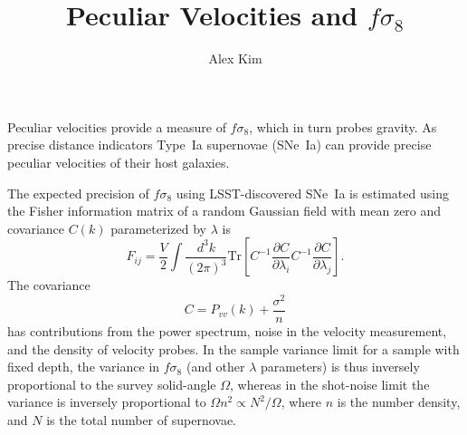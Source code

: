 \documentclass[a4paper,10pt]{article}
\title{Peculiar Velocities and $f\sigma_8$}
\author{Alex Kim}
\date{}
\begin{document}
\maketitle
Peculiar velocities provide a measure of $f\sigma_8$, which in turn probes gravity.  As precise distance indicators Type~Ia supernovae (SNe~Ia)
can provide precise peculiar velocities of their host galaxies.

The  expected precision of $f\sigma_8$ using LSST-discovered SNe~Ia is estimated using
the Fisher information matrix of a random Gaussian field with mean zero and covariance $C(k)$ parameterized by $\lambda$ is
\begin{equation}
F_{ij} = \frac{V}{2}\int \frac{d^3k}{(2\pi)^3} \text{Tr}\left[ C^{-1} \frac{\partial C}{\partial \lambda_i} C^{-1}
\frac{\partial C}{\partial \lambda_j} \right].
\end{equation}
The covariance
\begin{equation}
C = P_{vv}(k) + \frac{\sigma^2}{n}
\end{equation}
has contributions from the power spectrum, noise in the velocity measurement, and the density of velocity probes.
In the sample variance limit for a sample with fixed depth, the variance in $f\sigma_8$ (and other $\lambda$ parameters)
is thus inversely proportional to the survey solid-angle $\Omega$, whereas
in the shot-noise limit the variance is inversely proportional to $\Omega n^2 \propto N^2/\Omega$, where $n$ is the number density,
and $N$ is the total number of supernovae.  
\end{document}
